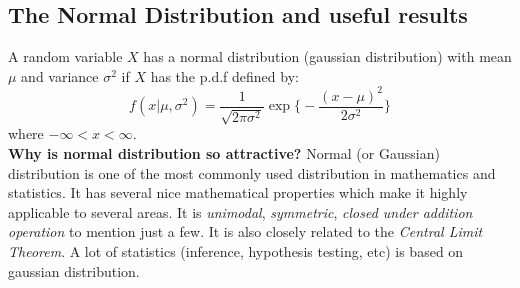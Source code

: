 \documentclass[english, 11pt]{article}
\begin{document}
\subsection{The Normal Distribution and useful results}
A random variable $X$ has a normal distribution (gaussian distribution) with mean $\mu$ and variance $\sigma^2$ if $X$ has the p.d.f defined by:
\[ f(x | \mu, \sigma^2) = \frac{1}{\sqrt{2 \pi \sigma^2}} \exp \bigg\{ - \frac{(x-\mu)^2}{2 \sigma^2} \bigg\} \]
where $-\infty < x< \infty$.\\

{\bf Why is normal distribution so attractive?} Normal (or Gaussian) distribution is one of the most commonly used distribution in mathematics and statistics. It has several nice mathematical properties which make it highly applicable to several areas. It is {\it unimodal}, {\it symmetric}, {\it closed under addition operation} to mention just a few. It is also closely related to the {\it Central Limit Theorem}. A lot of statistics (inference, hypothesis testing, etc) is based on gaussian distribution.\\
\end{document}
